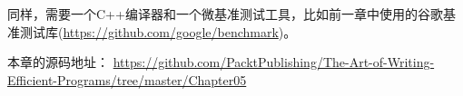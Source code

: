同样，需要一个C++编译器和一个微基准测试工具，比如前一章中使用的谷歌基准测试库(\url{https://github.com/google/benchmark})。

本章的源码地址： \url{https://github.com/PacktPublishing/The-Art-of-Writing-Efficient-Programs/tree/master/Chapter05}